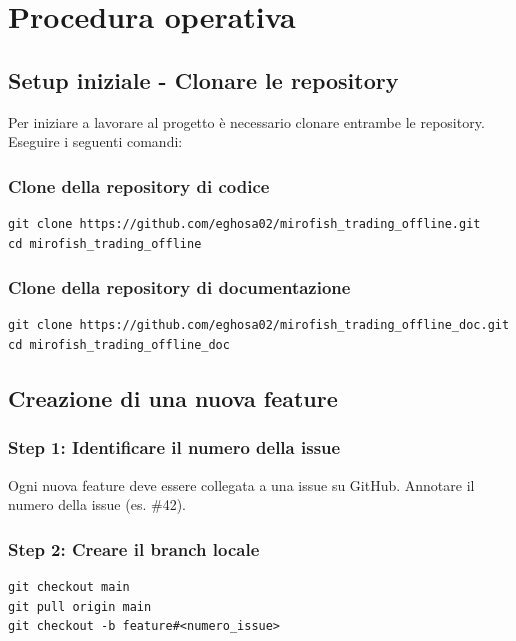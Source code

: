 \section{Procedura operativa}

\subsection{Setup iniziale - Clonare le repository}

Per iniziare a lavorare al progetto è necessario clonare entrambe le repository. Eseguire i seguenti comandi:

\subsubsection{Clone della repository di codice}
\begin{verbatim}
git clone https://github.com/eghosa02/mirofish_trading_offline.git
cd mirofish_trading_offline
\end{verbatim}

\subsubsection{Clone della repository di documentazione}
\begin{verbatim}
git clone https://github.com/eghosa02/mirofish_trading_offline_doc.git
cd mirofish_trading_offline_doc
\end{verbatim}

\subsection{Creazione di una nuova feature}

\subsubsection{Step 1: Identificare il numero della issue}
Ogni nuova feature deve essere collegata a una issue su GitHub. Annotare il numero della issue (es. \#42).

\subsubsection{Step 2: Creare il branch locale}
\begin{verbatim}
git checkout main
git pull origin main
git checkout -b feature#<numero_issue>
\end{verbatim}


